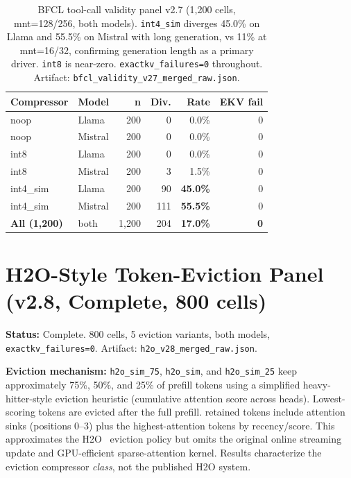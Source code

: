 \documentclass[11pt]{article}
\begin{document}
\begin{table}[htbp]
\centering\small\setlength\tabcolsep{5pt}
\renewcommand{\arraystretch}{1.05}
\begin{tabular}{llrrrr}
\toprule
\textbf{Compressor} & \textbf{Model} & \textbf{n} & \textbf{Div.} & \textbf{Rate} & \textbf{EKV fail} \\
\midrule
noop      & Llama   & 200 &   0 &  0.0\% & 0 \\
noop      & Mistral & 200 &   0 &  0.0\% & 0 \\
int8      & Llama   & 200 &   0 &  0.0\% & 0 \\
int8      & Mistral & 200 &   3 &  1.5\% & 0 \\
int4\_sim & Llama   & 200 &  90 & \textbf{45.0\%} & 0 \\
int4\_sim & Mistral & 200 & 111 & \textbf{55.5\%} & 0 \\
\midrule
\textbf{All (1,200)} & both & 1,200 & 204 & \textbf{17.0\%} & \textbf{0} \\
\bottomrule
\end{tabular}
\caption{BFCL tool-call validity panel v2.7 (1,200 cells, mnt=128/256, both models).
\texttt{int4\_sim} diverges 45.0\% on Llama and 55.5\% on Mistral with long generation,
vs 11\% at mnt=16/32, confirming generation length as a primary driver.
\texttt{int8} is near-zero. \texttt{exactkv\_failures=0} throughout.
Artifact: \texttt{bfcl\_validity\_v27\_merged\_raw.json}.}
\label{tab:bfcl-validity}
\end{table}

\section{H2O-Style Token-Eviction Panel (v2.8, Complete, 800 cells)}
\label{sec:h2o-panel}

\textbf{Status:} Complete. 800 cells, 5 eviction variants, both models,
\texttt{exactkv\_failures=0}. Artifact: \texttt{h2o\_v28\_merged\_raw.json}.

\textbf{Eviction mechanism:} \texttt{h2o\_sim\_75}, \texttt{h2o\_sim}, and
\texttt{h2o\_sim\_25} keep approximately 75\%, 50\%, and 25\% of prefill tokens
using a simplified heavy-hitter-style eviction heuristic (cumulative attention score
across heads). Lowest-scoring tokens are evicted after the full prefill. retained
tokens include attention sinks (positions 0--3) plus the highest-attention tokens
by recency/score. This approximates the H2O~\citep{zhang2023h2o} eviction policy
but omits the original online streaming update and GPU-efficient sparse-attention
kernel. Results characterize the eviction compressor \emph{class}, not the published
H2O system.
\end{document}
